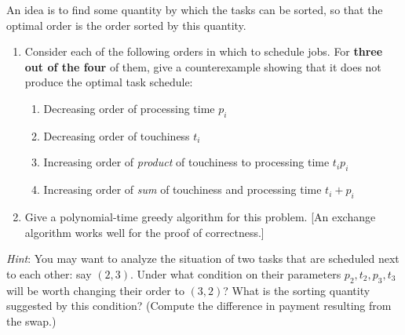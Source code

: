 \documentclass[letterpaper,11pt]{article}
\begin{document}
\begin{enumerate}
  
  
  
  
  

  An idea is to find some quantity by which the tasks can be sorted, so that the optimal
  order is the order sorted by this quantity.
  
  \begin{enumerate}
      \item Consider each of the following orders in which to schedule jobs. For \textbf{three out of the four} of them, give a counterexample showing that it does not produce the optimal task schedule:
      \begin{enumerate}
          \item Decreasing order of processing time $p_i$
          \item Decreasing order of touchiness $t_i$
          \item Increasing order of \emph{product} of touchiness to processing time $t_i p_i$
          \item Increasing order of \emph{sum} of touchiness and processing time $t_i + p_i$
      \end{enumerate}
     \item Give a polynomial-time greedy algorithm for this problem. [An exchange algorithm works well for the proof of correctness.]
  \end{enumerate}

 \emph{Hint}: You may want to analyze the situation
  of two tasks that are scheduled next to each other: say \( (2, 3) \).
  Under what condition on their parameters \( p_{2},t_{2},p_{3},t_{3} \) will be worth changing their
  order to \( (3,2) \)?
  What is the sorting quantity suggested by this condition?
  (Compute the difference in payment resulting from the swap.)
  

\end{enumerate}
\end{document}
